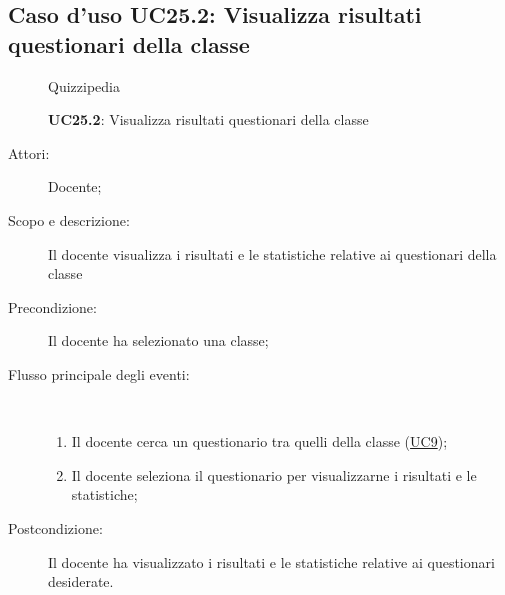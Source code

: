 \subsection{Caso d'uso UC25.2: Visualizza risultati questionari della classe}
	\begin{figure}[H]
		\centering
		\begin{resizedtikzpicture}{\textwidth}
		\begin{umlsystem}[x=0, fill=lightgray!20]{Quizzipedia}
		\end{umlsystem}
		\end{resizedtikzpicture}
		\caption{\textbf{UC25.2}: Visualizza risultati questionari della classe}
		\label{UC25.2}
	\end{figure}
\begin{description}
\item[Attori:] Docente;
\item[Scopo e descrizione:] Il docente visualizza i risultati e le statistiche relative ai questionari della classe
      \item[Precondizione:] Il docente ha selezionato una classe;

        \item[Flusso principale degli eventi:] \ 
 \begin{enumerate}
          \item Il docente cerca un questionario tra quelli della classe (\hyperlink{UC9}{UC9});
          \item Il docente seleziona il questionario per visualizzarne i risultati e le statistiche;

      \end{enumerate}
    \item[Postcondizione:] Il docente ha visualizzato i risultati e le statistiche relative ai questionari desiderate.
  \end{description}
\hypertarget{UC25.3}{}
